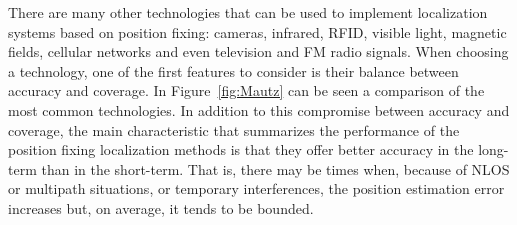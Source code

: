 There are many other technologies that can be used to implement localization systems based on position fixing: cameras, infrared, RFID, visible light, magnetic fields, cellular networks and even television and FM radio signals. 
When choosing a technology, one of the first features to consider is their balance between accuracy and coverage.
In Figure~\ref{fig:Mautz} can be seen a comparison of the most common technologies.
In addition to this compromise between accuracy and coverage, the main characteristic that summarizes the performance of the position fixing localization methods is that they offer better accuracy in the long-term than in the short-term. 
That is, there may be times when, because of NLOS or multipath situations, or temporary interferences, the position estimation error increases but, on average, it tends to be bounded.